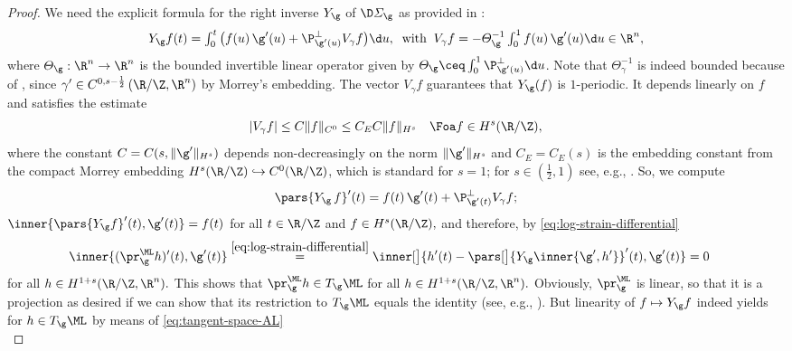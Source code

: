 \begin{proof}
We need the explicit formula for 
the right inverse $Y_\g$ of $\D\varSigma_\g$
as provided in \cite[Lemma 5.2]{knappmann-etal_2023}:
\begin{equation}\label{eq:right-inverse-Y}
	\textstyle
	Y_\g f(t)
	=
	\int_0^t \big( f(u) \, \g'(u) + \P_{\g'(u)}^\perp V_{\gamma}f\big) \d u,
	\;\;
	\text{with}
	\;\;
	V_{\gamma}f=-\varTheta_\g^{-1}\int_0^1 f(u) \, \g'(u)\d u\in\R^n
	,
\end{equation}
where $\varTheta_\g:\R^n\to\R^n$ is 
the bounded invertible linear operator
given by
$\varTheta_\g\ceq\int_0^1\P_{\g'(u)}^\perp \d u$. Note that $ \varTheta_{\gamma}^{-1} $ is indeed bounded because of \cite[Lemma 5.3]{knappmann-etal_2023}, since $ \gamma'\in C^{0,s-\frac{1}{2}}\left( \R/\Z,\R^n \right) $ by Morrey's embedding. 
The vector $V_{\gamma}f$ guarantees that $Y_\g(f)$ is $1$-periodic. 
It depends linearly  on $f$ and satisfies the estimate
\begin{equation}\label{eq:V-h-est}
 |V_{\gamma}f|\le C\|f\|_{C^0}\le C_EC\|f\|_{H^s}\quad\Foa f\in H^s(\R/\Z),
\end{equation}
where the constant $C=C(s,\|\g'\|_{H^s})$ depends non-de\-creas\-ingly on
the norm $\|\g'\|_{H^s}$ and $C_E=C_E(s)$ is the embedding constant from
the compact Morrey embedding $H^s(\R/\Z)\hookrightarrow
 C^0(\R/\Z)$, which is standard for $s=1$; for
 $s\in (\frac{1}{2},1)$ 
 see, e.g., \cite[Theorem A.2]{knappmann-etal_2023}. 
So, we compute
\begin{equation}\label{eq:derivative-right-inverse}
	\pars{Y_\g \, f}'(t) = f(t) \, \g'(t)+\P_{\g'(t)}^\perp V_{\gamma}f;
\end{equation}
$
	\inner{ \pars{Y_\g f}'(t),\g'(t) }=f(t)$ for all $t\in\R/\Z$ and 
$f\in H^s(\R/\Z),
$
and therefore, by \cref{eq:log-strain-differential}
\begin{align}
	\inner{ (\pr_\g^{\ML}h)'(t),\g'(t) }&
	\overset{\cref{eq:log-strain-differential}}{=}
	\inner[\big]{ 
		h'(t) - \pars[\big]{Y_\g \inner{\g', h'}}'(t)
		,
		\g'(t)
	}=0\label{eq:tangent-orthogonal}
\end{align}
for all $h\in H^{1+s}(\R/\Z,\R^n).$
This 
shows that $\pr_\g^{\ML}h\in T_\g\ML$ for all $h\in H^{1+s}(\R/\Z,\R^n).$
Obviously, $\pr_\g^{\ML}$ is linear, so that it is a projection as desired if
we can show that its restriction to $T_\g\ML$ equals the identity (see, e.g., \cite[9.13(1)]{alt_2016}). But linearity of $f\mapsto Y_\g f$ 
indeed yields for $h\in
T_\g\ML$  by means of \cref{eq:tangent-space-AL}
\begin{equation}\label{eq:proj-id}

\end{equation}
\end{proof}

